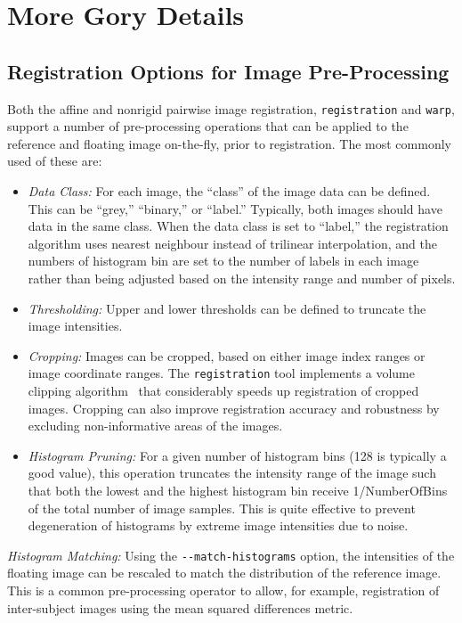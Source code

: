 \documentclass{InsightArticle}
\begin{document}
\clearpage
\section{More Gory Details}

\subsection{Registration Options for Image Pre-Processing}

Both the affine and nonrigid pairwise image registration, \verb|registration|
and \verb|warp|, support a number of pre-processing operations that can be
applied to the reference and floating image on-the-fly, prior to
registration. The most commonly used of these are:
\begin{itemize}
\item {\em Data Class:\/} For each image, the ``class'' of the image data can
  be defined. This can be ``grey,'' ``binary,'' or ``label.'' Typically, both
  images should have data in the same class. When the data class is set to
  ``label,'' the registration algorithm uses nearest neighbour instead of
  trilinear interpolation, and the numbers of histogram bin are set to the
  number of labels in each image rather than being adjusted based on the
  intensity range and number of pixels.
\item {\em Thresholding:\/} Upper and lower thresholds can be defined to
  truncate the image intensities.
\item {\em Cropping:\/} Images can be cropped, based on either image index
  ranges or image coordinate ranges. The \verb|registration| tool implements a
  volume clipping algorithm~\cite{Rohlfing:2003} that considerably speeds up
  registration of cropped images. Cropping can also improve registration
  accuracy and robustness by excluding non-informative areas of the images.
\item {\em Histogram Pruning:\/} For a given number of histogram bins (128 is
  typically a good value), this operation truncates the intensity range of the
  image such that both the lowest and the highest histogram bin receive
  1/NumberOfBins of the total number of image samples. This is quite effective
  to prevent degeneration of histograms by extreme image intensities due to
  noise.
\end{itemize}

{\em Histogram Matching:\/} Using the \verb|--match-histograms| option, the
intensities of the floating image can be rescaled to match the distribution of
the reference image. This is a common pre-processing operator to allow, for
example, registration of inter-subject images using the mean squared
differences metric.
\end{document}
